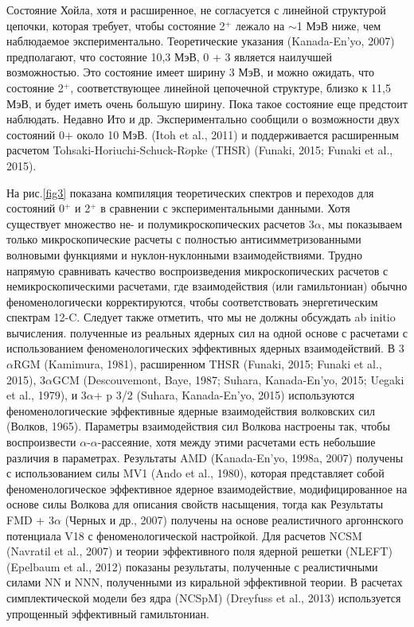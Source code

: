 \documentclass[fontsize=14pt]{scrarticle}
\begin{document}
Состояние Хойла, хотя и расширенное, не согласуется с линейной структурой цепочки, которая требует, чтобы состояние 2$^{+}$ лежало на $\sim$1 МэВ ниже, чем наблюдаемое экспериментально. Теоретические указания (Kanada-En'yo, 2007) предполагают, что состояние 10,3 МэВ, 0 + 3 является наилучшей возможностью. Это состояние имеет ширину 3 МэВ, и можно ожидать, что состояние 2$^{+}$, соответствующее линейной цепочечной структуре, близко к 11,5 МэВ, и будет иметь очень большую ширину. Пока такое состояние еще предстоит наблюдать. Недавно Ито и др. Экспериментально сообщили о возможности двух состояний 0+ около 10 МэВ. (Itoh et al., 2011) и поддерживается расширенным расчетом Tohsaki-Horiuchi-Schuck-R$\ddot{o}$pke (THSR) (Funaki, 2015; Funaki et al., 2015).

На рис.\ref{fig3} показана компиляция теоретических спектров и переходов для состояний 0$^{+}$ и 2$^{+}$ в сравнении с экспериментальными данными. Хотя существует множество не- и полумикроскопических расчетов 3$\alpha$, мы показываем только микроскопические расчеты с полностью антисимметризованными волновыми функциями и нуклон-нуклонными взаимодействиями. Трудно напрямую сравнивать качество воспроизведения микроскопических расчетов с немикроскопическими расчетами, где взаимодействия (или гамильтониан) обычно феноменологически корректируются, чтобы соответствовать энергетическим спектрам 12-C. Следует также отметить, что мы не должны обсуждать ab initio вычисления. полученные из реальных ядерных сил на одной основе с расчетами с использованием феноменологических эффективных ядерных взаимодействий.  В 3$\alpha$RGM (Kamimura, 1981), расширенном THSR (Funaki, 2015; Funaki et al., 2015), 3$\alpha$GCM (Descouvemont, Baye, 1987; Suhara, Kanada-En'yo, 2015; Uegaki et al., 1979), и 3$\alpha$+ p 3/2 (Suhara, Kanada-En'yo, 2015) используются феноменологические эффективные ядерные взаимодействия волковских сил (Волков, 1965). Параметры взаимодействия сил Волкова настроены так, чтобы воспроизвести $\alpha$-$\alpha$-рассеяние, хотя между этими расчетами есть небольшие различия в параметрах. Результаты AMD (Kanada-En'yo, 1998a, 2007) получены с использованием силы MV1 (Ando et al., 1980), которая представляет собой феноменологическое эффективное ядерное взаимодействие, модифицированное на основе силы Волкова для описания свойств насыщения, тогда как Результаты FMD + 3$\alpha$ (Черных и др., 2007) получены на основе реалистичного аргоннского потенциала V18 с феноменологической настройкой. Для расчетов NCSM (Navratil et al., 2007) и теории эффективного поля ядерной решетки (NLEFT) (Epelbaum et al., 2012) показаны результаты, полученные с реалистичными силами NN и NNN, полученными из киральной эффективной теории. В расчетах симплектической модели без ядра (NCSpM) (Dreyfuss et al., 2013) используется упрощенный эффективный гамильтониан.
\end{document}
